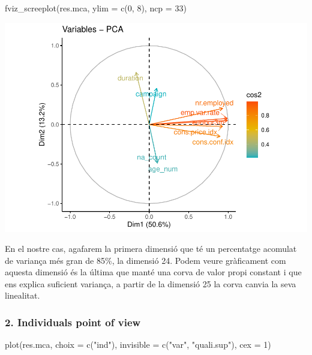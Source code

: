 \documentclass[
]{article}
\newenvironment{Shaded}{\begin{snugshade}}{\end{snugshade}}
\newcommand{\AttributeTok}[1]{\textcolor[rgb]{0.77,0.63,0.00}{#1}}
\newcommand{\DecValTok}[1]{\textcolor[rgb]{0.00,0.00,0.81}{#1}}
\newcommand{\FunctionTok}[1]{\textcolor[rgb]{0.00,0.00,0.00}{#1}}
\newcommand{\NormalTok}[1]{#1}
\newcommand{\StringTok}[1]{\textcolor[rgb]{0.31,0.60,0.02}{#1}}
\begin{document}
\begin{Shaded}
\begin{Highlighting}[]
\FunctionTok{fviz\_screeplot}\NormalTok{(res.mca,}
               \AttributeTok{ylim =} \FunctionTok{c}\NormalTok{(}\DecValTok{0}\NormalTok{, }\DecValTok{8}\NormalTok{),}
               \AttributeTok{ncp =} \DecValTok{33}\NormalTok{)}
\end{Highlighting}
\end{Shaded}

\includegraphics{Entrega2_files/figure-latex/unnamed-chunk-11-1.pdf}

En el nostre cas, agafarem la primera dimensió que té un percentatge
acomulat de variança més gran de 85\%, la dimensió 24. Podem veure
gràficament com aquesta dimensió és la última que manté una corva de
valor propi constant i que ens explica suficient variança, a partir de
la dimensió 25 la corva canvia la seva linealitat.

\hypertarget{individuals-point-of-view}{%
\subsubsection{2. Individuals point of
view}\label{individuals-point-of-view}}

\begin{Shaded}
\begin{Highlighting}[]
\FunctionTok{plot}\NormalTok{(res.mca, }\AttributeTok{choix =} \FunctionTok{c}\NormalTok{(}\StringTok{"ind"}\NormalTok{),}
     \AttributeTok{invisible =} \FunctionTok{c}\NormalTok{(}\StringTok{"var"}\NormalTok{, }\StringTok{"quali.sup"}\NormalTok{),}
     \AttributeTok{cex =} \DecValTok{1}\NormalTok{)}
\end{Highlighting}
\end{Shaded}
\end{document}
